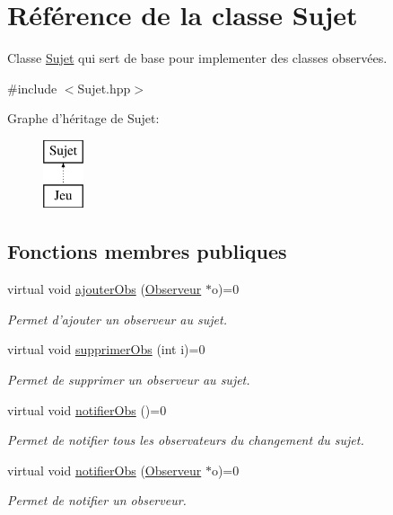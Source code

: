 \hypertarget{class_sujet}{\section{Référence de la classe Sujet}
\label{class_sujet}
}


Classe \hyperlink{class_sujet}{Sujet} qui sert de base pour implementer des classes observées.  




{\ttfamily \#include $<$Sujet.\-hpp$>$}

Graphe d'héritage de Sujet\-:\begin{figure}[H]
\begin{center}
\leavevmode
\includegraphics[height=2.000000cm]{class_sujet}
\end{center}
\end{figure}
\subsection*{Fonctions membres publiques}
\begin{DoxyCompactItemize}
\item 
virtual void \hyperlink{class_sujet_a77c41db2a06015ca931da1636e4dbc6d}{ajouter\-Obs} (\hyperlink{class_observeur}{Observeur} $\ast$o)=0
\begin{DoxyCompactList}\small\item\em Permet d'ajouter un observeur au sujet. \end{DoxyCompactList}\item 
virtual void \hyperlink{class_sujet_a84f5d1246b19042199924f90a69ec68b}{supprimer\-Obs} (int i)=0
\begin{DoxyCompactList}\small\item\em Permet de supprimer un observeur au sujet. \end{DoxyCompactList}\item 
virtual void \hyperlink{class_sujet_a28b5d0a1f6a476bfab9e12825a417179}{notifier\-Obs} ()=0
\begin{DoxyCompactList}\small\item\em Permet de notifier tous les observateurs du changement du sujet. \end{DoxyCompactList}\item 
virtual void \hyperlink{class_sujet_a895ceaa449463bd41526ee642569fbaa}{notifier\-Obs} (\hyperlink{class_observeur}{Observeur} $\ast$o)=0
\begin{DoxyCompactList}\small\item\em Permet de notifier un observeur. \end{DoxyCompactList}\end{DoxyCompactItemize}


